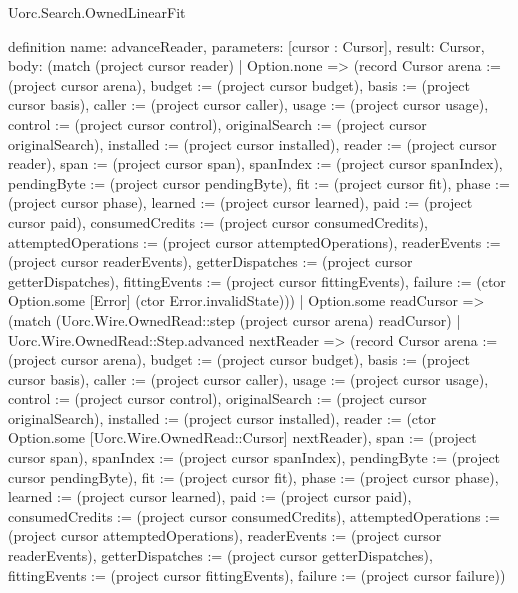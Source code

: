 \begin{lexlean}{Uorc.Search.OwnedLinearFit}
\begin{semanticmodule}
definition{
  name: advanceReader,
  parameters: [cursor : Cursor],
  result: Cursor,
  body: (match (project cursor reader)
    | Option.none => (record Cursor {arena := (project cursor arena), budget := (project cursor budget), basis := (project cursor basis), caller := (project cursor caller), usage := (project cursor usage), control := (project cursor control), originalSearch := (project cursor originalSearch), installed := (project cursor installed), reader := (project cursor reader), span := (project cursor span), spanIndex := (project cursor spanIndex), pendingByte := (project cursor pendingByte), fit := (project cursor fit), phase := (project cursor phase), learned := (project cursor learned), paid := (project cursor paid), consumedCredits := (project cursor consumedCredits), attemptedOperations := (project cursor attemptedOperations), readerEvents := (project cursor readerEvents), getterDispatches := (project cursor getterDispatches), fittingEvents := (project cursor fittingEvents), failure := (ctor Option.some [Error] (ctor Error.invalidState))})
    | Option.some readCursor => (match (Uorc.Wire.OwnedRead::step (project cursor arena) readCursor)
      | Uorc.Wire.OwnedRead::Step.advanced nextReader => (record Cursor {arena := (project cursor arena), budget := (project cursor budget), basis := (project cursor basis), caller := (project cursor caller), usage := (project cursor usage), control := (project cursor control), originalSearch := (project cursor originalSearch), installed := (project cursor installed), reader := (ctor Option.some [Uorc.Wire.OwnedRead::Cursor] nextReader), span := (project cursor span), spanIndex := (project cursor spanIndex), pendingByte := (project cursor pendingByte), fit := (project cursor fit), phase := (project cursor phase), learned := (project cursor learned), paid := (project cursor paid), consumedCredits := (project cursor consumedCredits), attemptedOperations := (project cursor attemptedOperations), readerEvents := (project cursor readerEvents), getterDispatches := (project cursor getterDispatches), fittingEvents := (project cursor fittingEvents), failure := (project cursor failure)})
}
\end{semanticmodule}
\end{lexlean}
